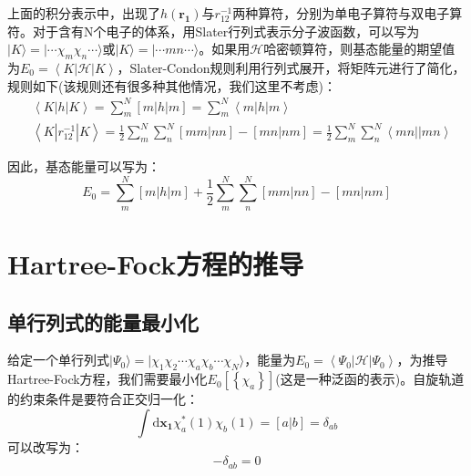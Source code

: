 \documentclass[]{article}
\begin{document}
上面的积分表示中，出现了$h(\mathbf{r_1})$与$r_{12}^{-1}$两种算符，分别为单电子算符与双电子算符。对于含有N个电子的体系，用Slater行列式表示分子波函数，可以写为$|K\rangle = |\cdots \chi_m \chi_n \cdots \rangle $或$|K\rangle = |\cdots mn \cdots \rangle $。如果用$\mathscr{H}$哈密顿算符，则基态能量的期望值为$E_0=\left\langle K|\mathscr{H}|K \right\rangle $，Slater-Condon规则利用行列式展开，将矩阵元进行了简化，规则如下(该规则还有很多种其他情况，我们这里不考虑)：
\begin{align}
	&\left\langle K|h|K \right\rangle =\sum\limits_m^N [m|h|m]=\sum\limits_m^N\left\langle m|h|m \right\rangle \\
	&\left\langle K|r_{12}^{-1}|K \right\rangle = \frac{1}{2}\sum\limits_m^N \sum\limits_n^N [mm|nn]-[mn|nm]=\frac{1}{2}\sum\limits_m^N \sum\limits_n^N \left\langle mn||mn \right\rangle 
\end{align}

因此，基态能量可以写为：
\begin{equation}
	E_0 = \sum\limits_m^N [m|h|m]+\frac{1}{2}\sum\limits_m^N \sum\limits_n^N [mm|nn]-[mn|nm]
\end{equation}
\section{Hartree-Fock方程的推导}
\subsection{单行列式的能量最小化}
给定一个单行列式$|\Psi_0\rangle=|\chi_1\chi_2\cdots\chi_a\chi_b\cdots\chi_N\rangle$，能量为$E_0=\left\langle \Psi_0|\mathscr{H}|\Psi_0\right\rangle $，为推导Hartree-Fock方程，我们需要最小化$E_0\left[ \left\lbrace \chi_a\right\rbrace\right] $(这是一种泛函的表示)。自旋轨道的约束条件是要符合正交归一化：
\begin{equation}
	\int \mathrm{d}\mathbf{x_1}\chi_a^*(1)\chi_b(1)=[a|b]=\delta_{ab}
\end{equation}
可以改写为：
\begin{equation}
	[a|b]-\delta_{ab}=0
\end{equation}
\end{document}
